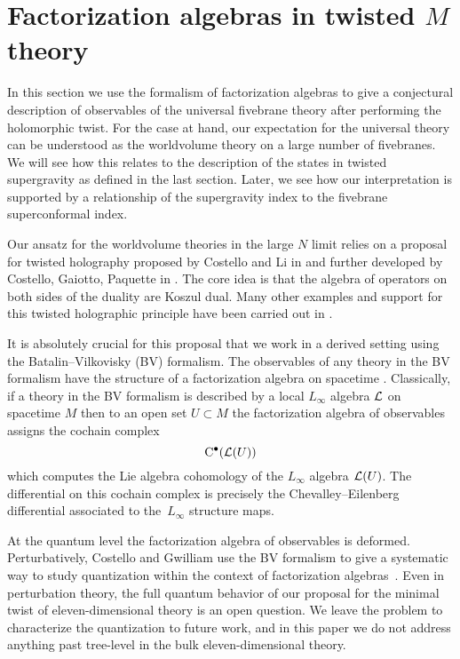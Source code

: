 %
%
%

\section{Factorization algebras in twisted $M$ theory}
\label{s:fact}

In this section we use the formalism of factorization algebras to give a conjectural description of observables of the universal fivebrane theory after performing the holomorphic twist.
For the case at hand, our expectation for the universal theory can be understood as the worldvolume theory on a large number of fivebranes. 
We will see how this relates to the description of the states in twisted supergravity as defined in the last section.
Later, we see how our interpretation is supported by a relationship of the supergravity index to the fivebrane superconformal index.

Our ansatz for the worldvolume theories in the large $N$ limit relies on a proposal for twisted holography proposed by Costello and Li in \cite{CLsugra} and further developed by Costello, Gaiotto, Paquette in \cite{CostelloM2,CostelloOmega,costello2021twisted,CP}.
The core idea is that the algebra of operators on both sides of the duality are Koszul dual. 
Many other examples and support for this twisted holographic principle have been carried out in \cite{Oh:2021wes,Oh:2020hph,Gaiotto:2021xce}.

It is absolutely crucial for this proposal that we work in a derived setting using the Batalin--Vilkovisky (BV) formalism. 
The observables of any theory in the BV formalism have the structure of a factorization algebra on spacetime \cite{CG2}. 
Classically, if a theory in the BV formalism is described by a local $L_\infty$ algebra $\mathcal L$ on spacetime $M$ then to an open set $U \subset M$ the factorization algebra of observables assigns the cochain complex
\[
{\rm C}^\bullet(\mathcal L(U))
\]
which computes the Lie algebra cohomology of the $L_\infty$ algebra $\mathcal L(U)$. 
The differential on this cochain complex is precisely the Chevalley--Eilenberg differential associated to the~$L_\infty$ structure maps. 

At the quantum level the factorization algebra of observables is deformed.
Perturbatively, Costello and Gwilliam use the BV formalism to give a systematic way to study quantization within the context of factorization algebras~\cite{CG2}. 
Even in perturbation theory, the full quantum behavior of our proposal for the minimal twist of eleven-dimensional theory is an open question. 
We leave the problem to characterize the quantization to future work, and in this paper we do not address anything past tree-level in the bulk eleven-dimensional theory.

